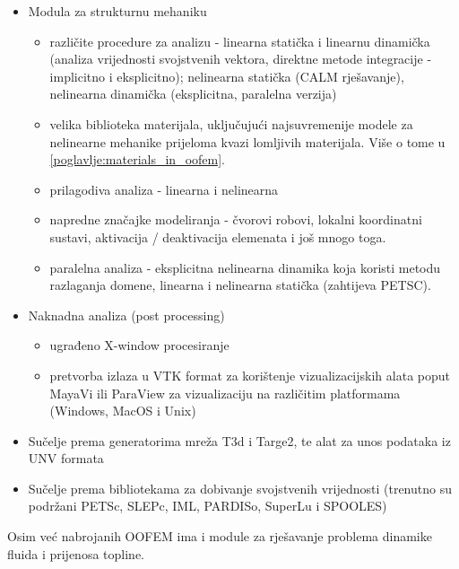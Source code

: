 \documentclass[a4paper,twoside,12pt]{memoir} %
\begin{document}
\begin{itemize}
\begin{itemize}
    \end{itemize}
    \item Modula za strukturnu mehaniku
        \begin{itemize}
            \item različite procedure za analizu - linearna statička i linearnu dinamička (analiza vrijednosti svojstvenih vektora, direktne metode integracije - implicitno i eksplicitno); nelinearna statička (CALM rješavanje), nelinearna dinamička (eksplicitna, paralelna verzija)
            \item velika biblioteka materijala, uključujući najsuvremenije modele za nelinearne mehanike prijeloma kvazi lomljivih materijala. Više o tome u \ref{poglavlje:materials_in_oofem}.
            \item prilagodiva analiza - linearna i nelinearna 
            \item napredne značajke modeliranja - čvorovi robovi, lokalni koordinatni sustavi, aktivacija / deaktivacija elemenata i još mnogo toga.
            \item paralelna analiza - eksplicitna nelinearna dinamika koja koristi metodu razlaganja domene, linearna i nelinearna statička (zahtijeva PETSC).
        \end{itemize}
    \item Naknadna analiza (post processing)
        \begin{itemize}
            \item ugrađeno X-window procesiranje
            \item pretvorba izlaza u VTK format za korištenje vizualizacijskih alata poput MayaVi ili ParaView za vizualizaciju na različitim platformama (Windows, MacOS i Unix)
        \end{itemize}
    \item Sučelje prema generatorima mreža T3d i Targe2, te alat za unos podataka iz UNV formata
    \item Sučelje prema bibliotekama za dobivanje svojstvenih vrijednosti (trenutno su podržani PETSc, SLEPc, IML, PARDISo, SuperLu i SPOOLES) 
\end{itemize}
Osim već nabrojanih OOFEM ima i module za rješavanje problema dinamike fluida i prijenosa topline.
\end{document}
